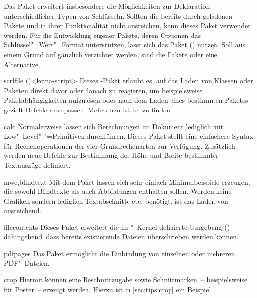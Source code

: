 \begin{packages}
  Das Paket  erweitert insbesondere die Möglichkeiten zur 
  Deklaration unterschiedlicher Typen von Schlüsseln. Sollten die bereits durch 
  \TUDScript geladenen Pakete  und  in ihrer 
  Funktionalität nicht ausreichen, kann dieses Paket verwendet werden. Für die 
  Entwicklung eigener Pakete, deren Optionen das Schlüssel"=Wert"=Format 
  unterstützen, lässt sich das Paket ()  
  nutzen. Soll aus einem Grund auf \KOMAScript{} gänzlich verzichtet werden, 
  sind die Pakete  oder  eine Alternative.
\item[scrlfile]()<koma-script>
  Dieses \KOMAScript-Paket erlaubt es, auf das Laden von Klassen oder Paketen 
  direkt davor oder danach zu reagieren, um beispielsweise Paketabhängigkeiten 
  aufzulösen oder nach dem Laden eines bestimmten Paketes gezielt Befehle 
  anzupassen. Mehr dazu ist im \scrguide zu finden.
\item[calc]
  Normalerweise lassen sich Berechnungen im Dokument lediglich mit 
  Low"~Level"~"=Primitiven durchführen. Dieses Paket stellt eine 
  einfachere Syntax für Rechenoperationen der vier Grundrechenarten zur 
  Verfügung. Zusätzlich werden neue Befehle zur Bestimmung der Höhe und Breite 
  bestimmter Textauszüge definiert.
\item[mwe,blindtext]
  Mit dem Paket  lassen sich sehr einfach Minimalbeispiele 
  erzeugen, die sowohl Blindtexte als auch Abbildungen enthalten sollen. Werden 
  keine Grafiken sondern lediglich Textabschnitte etc. benötigt, ist das Laden 
  von  ausreichend.
\item[filecontents]
  Dieses Paket erweitert die im "~Kernel definierte Umgebung 
  () dahingehend, dass bereits 
  existierende Dateien überschrieben werden können.
\item[pdfpages]
  Das Paket ermöglicht die Einbindung von einzelnen oder mehreren PDF"~Dateien.
\item[crop]
  Hiermit können eine Beschnittzugabe sowie Schnittmarken~-- beispielsweise für 
  Poster~-- erzeugt werden. Hierzu ist in \autoref{sec:tips:crop} ein Beispiel 

\end{packages}
